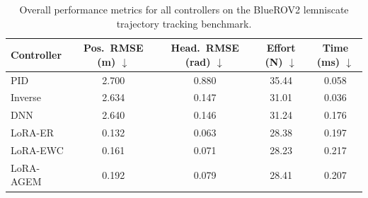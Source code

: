 \begin{table}[htbp]
\centering
\caption{Overall performance metrics for all controllers on the BlueROV2 lemniscate trajectory tracking benchmark.}
\label{tab:overall_results}
\begin{tabular}{lcccc}
\toprule
Controller & Pos.\ RMSE (m) $\downarrow$ & Head.\ RMSE (rad) $\downarrow$ & Effort (N) $\downarrow$ & Time (ms) $\downarrow$ \\
\midrule
PID & 2.700 & 0.880 & 35.44 & 0.058 \\
Inverse & 2.634 & 0.147 & 31.01 & 0.036 \\
DNN & 2.640 & 0.146 & 31.24 & 0.176 \\
LoRA-ER & 0.132 & 0.063 & 28.38 & 0.197 \\
LoRA-EWC & 0.161 & 0.071 & 28.23 & 0.217 \\
LoRA-AGEM & 0.192 & 0.079 & 28.41 & 0.207 \\
\bottomrule
\end{tabular}
\end{table}